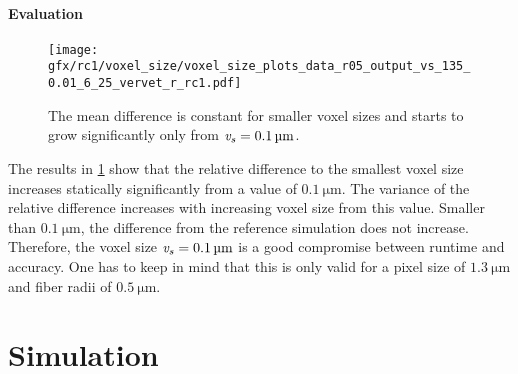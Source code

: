 \paragraph{Evaluation}
%
\begin{figure}[!t]
\centering
\texttt{[image: gfx/rc1/voxel\_size/voxel\_size\_plots\_data\_r05\_output\_vs\_135\_0.01\_6\_25\_vervet\_r\_rc1.pdf]}
\caption{The mean difference is constant for smaller voxel sizes and starts to grow significantly only from $\textnormal{$\mathit{v_{s}}$}=\SI{0.1}{\micro\meter}$.}
\label{fig:voxelsizeNoise}
\end{figure}
% 
The results in \cref{fig:voxelsizeNoise} show that the relative difference to the smallest voxel size increases statically significantly from a value of $\SI{0.1}{\micro\meter}$.
The variance of the relative difference increases with increasing voxel size from this value.
Smaller than $\SI{0.1}{\micro\meter}$, the difference from the reference simulation does not increase.
Therefore, the voxel size $\textnormal{$\mathit{v_{s}}$} = \SI{0.1}{\micro\meter}$ is a good compromise between runtime and accuracy.
One has to keep in mind that this is only valid for a pixel size of $\SI{1.3}{\micro\meter}$ and fiber radii of $\SI{0.5}{\micro\meter}$.
% 
%
%
\newpage %
\section{Simulation}
%
